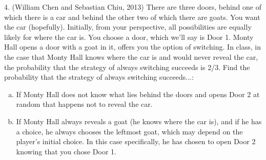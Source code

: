 \documentclass{article}
\begin{document}
4. (William Chen and Sebastian Chiu, 2013) There are three doors, behind one of which there is a car and behind the other two of which there are goats. You want the car (hopefully). Initially, from your perspective, all possibilities are equally likely for where the car is. You choose a door, which we'll say is Door 1. Monty Hall opens a door with a goat in it, offers you the option of switching. In class, in the case that Monty Hall knows where the car is and would never reveal the car, the probability that the strategy of always switching succeeds is 2/3. Find the probability that the strategy of always switching succeeds...:

\begin{enumerate}[(a)]
    \item  If Monty Hall does not know what lies behind the doors and opens Door 2 at random that happens not to reveal the car.
    
    
    \item If Monty Hall always reveals a goat (he knows where the car is), and if he has a choice, he always chooses the leftmost goat, which may depend on the player's initial choice. In this case specifically, he has chosen to open Door 2 knowing that you chose Door 1.
    
    
\end{enumerate}
\end{document}
